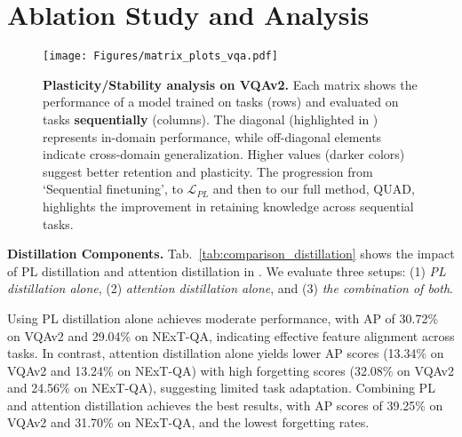 \section{Ablation Study and Analysis}
\label{sec:ablation}
\begin{figure*}[ht]
    \centering
    \texttt{[image: Figures/matrix\_plots\_vqa.pdf]}
    \vspace{-8mm}
    \caption{\textbf{Plasticity/Stability analysis on VQAv2. }Each matrix shows the performance of a model trained on tasks (rows) and evaluated on tasks \textbf{sequentially} (columns). The diagonal (highlighted in {\color{orange}{orange}}) represents in-domain performance, while off-diagonal elements indicate cross-domain generalization. Higher values (darker colors) suggest better retention and plasticity. The progression from `Sequential finetuning', to $\mathcal{L}_{PL}$ and then to our full method, QUAD, highlights the improvement in retaining knowledge across sequential tasks.}
    \vspace{-3mm}
    \label{fig:cross_task_generalization}
\end{figure*}

\noindent {} \noindent\textbf{Distillation Components. }Tab.~\ref{tab:comparison_distillation} shows the impact of PL distillation and attention distillation in \qstmethodshort{}. We evaluate three setups: (1) \textit{PL distillation alone}, (2) \textit{attention distillation alone}, and (3) \textit{the combination of both}.

Using PL distillation alone achieves moderate performance, with AP  of 30.72\% on VQAv2 and 29.04\% on NExT-QA, indicating effective feature alignment across tasks. In contrast, attention distillation alone yields lower AP scores (13.34\% on VQAv2 and 13.24\% on NExT-QA) with high forgetting scores (32.08\% on VQAv2 and 24.56\% on NExT-QA), suggesting limited task adaptation. Combining PL and attention distillation achieves the best results, with AP scores of 39.25\% on VQAv2 and 31.70\% on NExT-QA, and the lowest forgetting rates.


